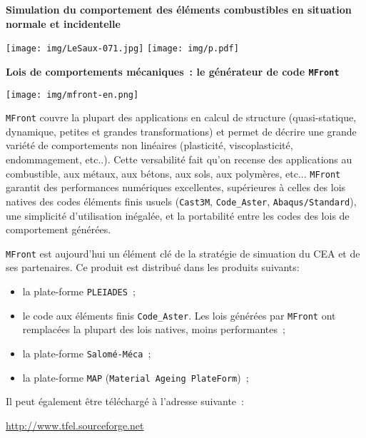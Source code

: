 \documentclass[11pt,a4paper]{moderncv}
\newcommand{\paragraph}[1]{\textbf{#1}}
\begin{document}
\paragraph{Simulation du comportement des éléments combustibles en
  situation normale et incidentelle}

\begin{center}
  \texttt{[image: img/LeSaux-071.jpg]}\quad
  \texttt{[image: img/p.pdf]}
\end{center}




\paragraph{Lois de comportements mécaniques~: le générateur de
  code \texttt{MFront}}

\begin{center}
  \texttt{[image: img/mfront-en.png]}
\end{center}

\texttt{MFront} couvre la plupart des applications en calcul de
structure (quasi-statique, dynamique, petites et grandes
transformations) et permet de décrire une grande variété de
comportements non linéaires (plasticité, viscoplasticité,
endommagement, etc..). Cette versabilité fait qu'on recense des
applications au combustible, aux métaux, aux bétons, aux sols, aux
polymères, etc... \texttt{MFront} garantit des performances numériques
excellentes, supérieures à celles des lois natives des codes éléments
finis usuels (\texttt{Cast3M}, \texttt{Code\_Aster},
\texttt{Abaqus/Standard}), une simplicité d'utilisation inégalée, et
la portabilité entre les codes des lois de comportement générées.

\texttt{MFront} est aujourd'hui un élément clé de la stratégie de
simuation du CEA et de ses partenaires. Ce produit est distribué dans
les produits suivants:
\begin{itemize}
\item la plate-forme \texttt{PLEIADES}~;
\item le code aux éléments finis \texttt{Code\_Aster}. Les lois
  générées par \texttt{MFront} ont remplacées la plupart des lois
  natives, moins performantes~;
\item la plate-forme \texttt{Salomé-Méca}~;
\item la plate-forme \texttt{MAP} (\texttt{Material Ageing
    PlateForm})~;
\end{itemize}
Il peut également être téléchargé à l'adresse suivante~:
\begin{center}
  \url{http://www.tfel.sourceforge.net}
\end{center}
\end{document}

